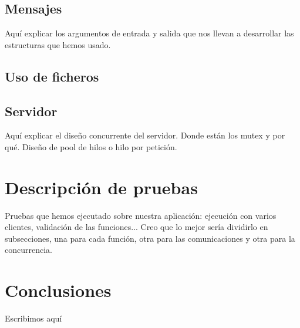 \documentclass[]{article}
\begin{document}
\subsection{Mensajes}
\label{subsec:mensajes}
Aquí explicar los argumentos de entrada y salida que nos llevan a desarrollar las estructuras que hemos usado.


\subsection{Uso de ficheros}
\label{subsec:uso_de_ficheros}

\subsection{Servidor}
\label{subsec:servidor}
Aquí explicar el diseño concurrente del servidor. Donde están los mutex y por qué. Diseño de pool de hilos o hilo por petición. 

\section{Descripción de pruebas}
\label{sec:descripcion_de_pruebas}
Pruebas que hemos ejecutado sobre nuestra aplicación: ejecución con varios clientes, validación de las funciones... Creo que lo mejor sería dividirlo en subsecciones, una para cada función, otra para las comunicaciones y otra para la concurrencia. 



\section{Conclusiones}
\label{sec:conclusiones}
Escribimos aquí
\end{document}
